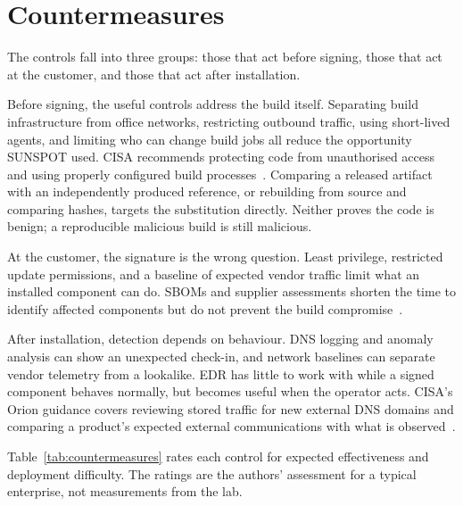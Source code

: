 \section{Countermeasures}
\label{sec:countermeasures}

The controls fall into three groups: those that act before signing, those that act at the customer, and those that act after installation.

Before signing, the useful controls address the build itself. Separating build infrastructure from office networks, restricting outbound traffic, using short-lived agents, and limiting who can change build jobs all reduce the opportunity SUNSPOT used. CISA recommends protecting code from unauthorised access and using properly configured build processes~\cite{cisa-supply-chain}. Comparing a released artifact with an independently produced reference, or rebuilding from source and comparing hashes, targets the substitution directly. Neither proves the code is benign; a reproducible malicious build is still malicious.

At the customer, the signature is the wrong question. Least privilege, restricted update permissions, and a baseline of expected vendor traffic limit what an installed component can do. SBOMs and supplier assessments shorten the time to identify affected components but do not prevent the build compromise~\cite{cisa-supply-chain}.

After installation, detection depends on behaviour. DNS logging and anomaly analysis can show an unexpected check-in, and network baselines can separate vendor telemetry from a lookalike. EDR has little to work with while a signed component behaves normally, but becomes useful when the operator acts. CISA's Orion guidance covers reviewing stored traffic for new external DNS domains and comparing a product's expected external communications with what is observed~\cite{cisa-aa20-352a,cisa-supply-chain}.

Table~\ref{tab:countermeasures} rates each control for expected effectiveness and deployment difficulty. The ratings are the authors' assessment for a typical enterprise, not measurements from the lab.

